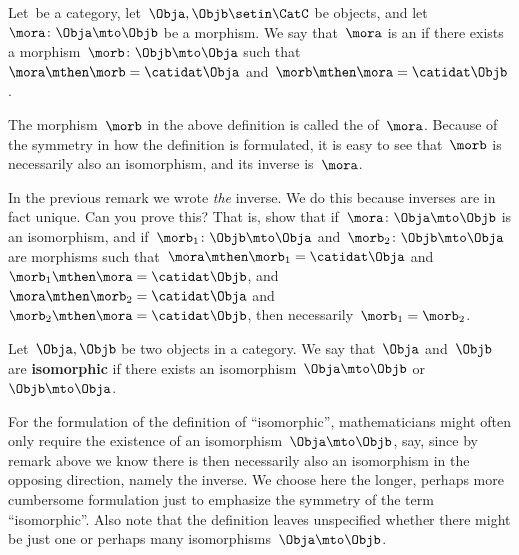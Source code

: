 \begin{ctdefinition}[Isomorphism]
    \label{def:isomorphism}
    Let~\CatC be a category, let~$\Obja,\Objb \setin \CatC$ be objects, and let~$\mora \colon \Obja \mto \Objb$ be a morphism.
    We say that~$\mora$ is an \emph{} if there exists a morphism~$\morb\colon \Objb \mto \Obja$ such that~$\mora \mthen \morb = \catidat\Obja$ and~$\morb \mthen \mora = \catidat\Objb$.
\end{ctdefinition}

\begin{remark}
    \label{rem:inverse}
    The morphism~$\morb$ in the above definition is called the \textbf{} of~$\mora$.
    Because of the symmetry in how the definition is formulated, it is easy to see that~$\morb$ is necessarily also an isomorphism, and its inverse is~$\mora$.
\end{remark}

\begin{exercise}
    \label{ex:isoinverse}
    In the previous remark we wrote \emph{the} inverse.
    We do this because inverses are in fact unique.
    Can you prove this?
    That is, show that if~$\mora \colon \Obja \mto \Objb$ is an isomorphism, and if~$\morb_1\colon \Objb \mto \Obja$ and~$\morb_2\colon \Objb \mto \Obja$ are morphisms such that~$\mora \mthen \morb_1 = \catidat\Obja$ and~$\morb_1 \mthen \mora = \catidat\Objb$, and~$\mora \mthen \morb_2 = \catidat\Obja$ and~$\morb_2 \mthen \mora = \catidat\Objb$, then necessarily~$\morb_1 = \morb_2$.
\end{exercise}
\begin{solution}
    \missingsolution
\end{solution}

\begin{ctdefinition}
    Let~$\Obja,\Objb$ be two objects in a category.
    We say that~$\Obja$ and~$\Objb$ are \textbf{isomorphic} if there exists an isomorphism~$\Obja \mto \Objb$ or~$\Objb \mto \Obja$.
\end{ctdefinition}

For the formulation of the definition of ``isomorphic'', mathematicians might often only require the existence of an isomorphism~$\Obja \mto \Objb$, say, since by remark above we know there is then necessarily also an isomorphism in the opposing direction, namely the inverse.
We choose here the longer, perhaps more cumbersome formulation just to emphasize the symmetry of the term ``isomorphic''.
Also note that the definition leaves unspecified whether there might be just one or perhaps many isomorphisms~$\Obja \mto \Objb$.

